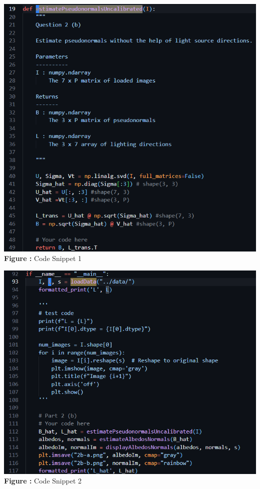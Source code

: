 \documentclass{article}
\begin{document}
	\begin{minipage}{0.48\linewidth}
	\centering
	\includegraphics[width=\linewidth]{./Q2_b_cns1.png}
	\textbf{Figure \thefigure:} Code Snippet 1  %
	\label{fig:Q2_b_cns1}         %
	\end{minipage}
\hfill
	\begin{minipage}{0.48\linewidth}
	\centering
	\includegraphics[width=\linewidth]{./Q2_b_cns2.png}
	\textbf{Figure \thefigure:} Code Snippet 2  %
	\label{fig:Q2_b_cns2}         %
	\end{minipage}
\end{document}
